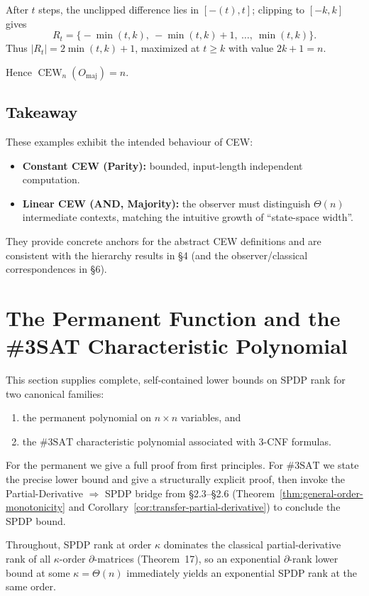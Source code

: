\documentclass[12pt]{article}
\theoremstyle{definition}
\theoremstyle{definition}
\theoremstyle{remark}
\theoremstyle{remark}
\begin{document}
After $t$ steps, the unclipped difference lies in $[-(t), t]$; clipping to $[-k,k]$ gives
\[
R_t=\bigl\{-\min(t,k),\ -\min(t,k)+1,\ \dots,\ \min(t,k)\bigr\}.
\]
Thus $|R_t|=2\min(t,k)+1$, maximized at $t\ge k$ with value $2k+1=n$.

Hence $\operatorname{CEW}_n(O_{\mathrm{maj}})=n$.

\subsection{Takeaway}

These examples exhibit the intended behaviour of CEW:
\begin{itemize}
\item \textbf{Constant CEW (Parity):} bounded, input-length independent computation.
\item \textbf{Linear CEW (AND, Majority):} the observer must distinguish $\Theta(n)$ intermediate contexts, matching the intuitive growth of ``state-space width''.
\end{itemize}
They provide concrete anchors for the abstract CEW definitions and are consistent with the hierarchy results in \S4 (and the observer/classical correspondences in \S6).

\section{The Permanent Function and the \#3SAT Characteristic Polynomial}
\label{sec:permanent-3sat}

This section supplies complete, self-contained lower bounds on SPDP rank for two canonical families:
\begin{enumerate}
\item the permanent polynomial on $n\times n$ variables, and
\item the $\#3\mathrm{SAT}$ characteristic polynomial associated with 3-CNF formulas.
\end{enumerate}

For the permanent we give a full proof from first principles. For $\#3\mathrm{SAT}$ we state the precise lower bound and give a structurally explicit proof, then invoke the Partial-Derivative $\Rightarrow$ SPDP bridge from \S2.3--\S2.6 (Theorem~\ref{thm:general-order-monotonicity} and Corollary~\ref{cor:transfer-partial-derivative}) to conclude the SPDP bound.

Throughout, SPDP rank at order $\kappa$ dominates the classical partial-derivative rank of all $\kappa$-order $\partial$-matrices (Theorem~17), so an exponential $\partial$-rank lower bound at some $\kappa=\Theta(n)$ immediately yields an exponential SPDP rank at the same order.
\end{document}
